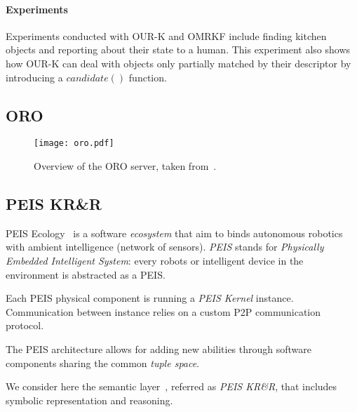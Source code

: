 \documentclass{IEEEtran}
\begin{document}
\paragraph{Experiments} Experiments conducted with OUR-K and OMRKF include
finding kitchen objects and reporting about their state to a human.  This
experiment also shows how OUR-K can deal with objects only partially matched by
their descriptor by introducing a $candidate()$ function.

\subsection{ORO}
\label{sect|oro}

\begin{figure}
    \centering
    \texttt{[image: oro.pdf]}

    \caption{Overview of the ORO server, taken from~\cite{Lemaignan2012}.}

    \label{fig|oro}
\end{figure}

\subsection{PEIS KR\&R}
\label{sect|peis-ecology}

{\sc PEIS Ecology}~\cite{Saffiotti2005} is a software \emph{ecosystem} that aim
to binds autonomous robotics with ambient intelligence (network of sensors).
\emph{PEIS} stands for \emph{Physically Embedded Intelligent System}: every
robots or intelligent device in the environment is abstracted as a PEIS.

Each PEIS physical component is running a \emph{PEIS Kernel} instance.
Communication between instance relies on a custom P2P communication protocol.

The PEIS architecture allows for adding new abilities through software
components sharing the common \emph{tuple space}.

We consider here the semantic layer~\cite{Daoutis2009}, referred as \emph{PEIS
KR\&R}, that includes symbolic representation and reasoning.

\end{document}
